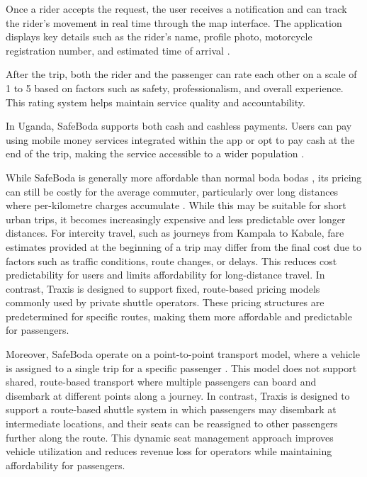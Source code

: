 Once a rider accepts the request, the user receives a notification and can track
the rider’s movement in real time through the map interface. The application
displays key details such as the rider’s name, profile photo, motorcycle
registration number, and estimated time of arrival
\cite{safeboda2024acceptingrides}.


After the trip, both the rider and the passenger can rate each other on a scale
of 1 to 5 based on factors such as safety, professionalism, and overall
experience. This rating system helps maintain service quality and
accountability.


In Uganda, SafeBoda supports both cash and cashless payments. Users can pay
using mobile money services integrated within the app or opt to pay cash at the
end of the trip, making the service accessible to a wider population
\cite{alqahami2022safeboda}.


While SafeBoda is generally more affordable than normal boda bodas
\cite{DignitedUberTaxifySafeBoda}, its pricing can still be costly for the
average commuter, particularly over long distances where per-kilometre charges
accumulate \cite{ShellFoundationSafeBodaImpact}. While this may be suitable for
short urban trips, it becomes increasingly expensive and less predictable over
longer distances. For intercity travel, such as journeys from Kampala to Kabale,
fare estimates provided at the beginning of a trip may differ from the final
cost due to factors such as traffic conditions, route changes, or delays. This
reduces cost predictability for users and limits affordability for long-distance
travel. In contrast, Traxis is designed to support fixed, route-based pricing
models commonly used by private shuttle operators. These pricing structures are
predetermined for specific routes, making them more affordable and predictable
for passengers.


Moreover, SafeBoda operate on a point-to-point transport model, where a vehicle
is assigned to a single trip for a specific passenger \cite{ObwotSafeCar2022}.
This model does not support shared, route-based transport where multiple
passengers can board and disembark at different points along a journey. In
contrast, Traxis is designed to support a route-based shuttle system in which
passengers may disembark at intermediate locations, and their seats can be
reassigned to other passengers further along the route. This dynamic seat
management approach improves vehicle utilization and reduces revenue loss for
operators while maintaining affordability for passengers.



